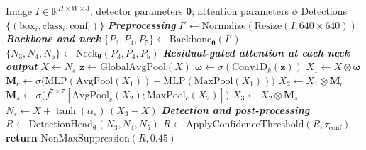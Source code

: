 \documentclass[MScCS]{uccthesis}
\begin{document}
\begin{algorithm}[!ht]
\caption{Forward pass of RGDA-YOLOv8m}
\label{alg:forward}
\begin{algorithmic}[1]
\Require Image $I \in \mathbb{R}^{H \times W \times 3}$; detector parameters
         $\boldsymbol{\theta}$; attention parameters $\phi$
\Ensure  Detections $\{(\mathrm{box}_i, \mathrm{class}_i, \mathrm{conf}_i)\}$
\Statex
\Statex \textit{\textbf{Preprocessing}}
\State $I' \gets \mathrm{Normalize}(\mathrm{Resize}(I, 640 \times 640))$
\Statex
\Statex \textit{\textbf{Backbone and neck}}
\State $\{P_3, P_4, P_5\} \gets \mathrm{Backbone}_{\boldsymbol{\theta}}(I')$
\State $\{N_3, N_4, N_5\} \gets \mathrm{Neck}_{\boldsymbol{\theta}}(P_3, P_4, P_5)$
\Statex
\Statex \textit{\textbf{Residual-gated attention at each neck output}}
   \State $X \gets N_s$
   \State $\mathbf{z} \gets \mathrm{GlobalAvgPool}(X)$
   \State $\boldsymbol{\omega} \gets \sigma(\mathrm{Conv1D}_{k}(\mathbf{z}))$
   \State $X_1 \gets X \otimes \boldsymbol{\omega}$
   \State $\mathbf{M}_c \gets \sigma\bigl(
             \mathrm{MLP}(\mathrm{AvgPool}(X_1)) +
             \mathrm{MLP}(\mathrm{MaxPool}(X_1)) \bigr)$
   \State $X_2 \gets X_1 \otimes \mathbf{M}_c$
   \State $\mathbf{M}_s \gets \sigma\bigl( f^{7\times7}[
             \mathrm{AvgPool}_{c}(X_2); \mathrm{MaxPool}_{c}(X_2)] \bigr)$
   \State $X_3 \gets X_2 \otimes \mathbf{M}_s$
   \State $N_s \gets X + \tanh(\alpha_s)\,(X_3 - X)$
\EndFor
\Statex
\Statex \textit{\textbf{Detection and post-processing}}
\State $R \gets \mathrm{DetectionHead}_{\boldsymbol{\theta}}(N_3, N_4, N_5)$
\State $R \gets \mathrm{ApplyConfidenceThreshold}(R, \tau_{\mathrm{conf}})$
\State \textbf{return} $\mathrm{NonMaxSuppression}(R, 0.45)$
\end{algorithmic}
\end{algorithm}
\end{document}
